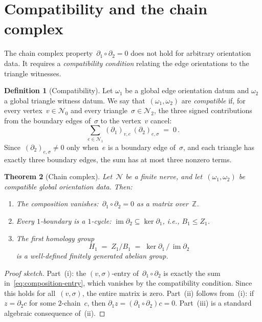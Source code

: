 \documentclass[11pt,a4paper]{article}
\theoremstyle{plain}
\newtheorem{theorem}{Theorem}[section]
\theoremstyle{definition}
\newtheorem{definition}[theorem]{Definition}
\theoremstyle{remark}
\newcommand{\ZZ}{\mathbb{Z}}
\newcommand{\cN}{\mathcal{N}}
\begin{document}
\section{Compatibility and the chain complex}
\label{sec:chain-complex}

The chain complex property~$\partial_1 \circ \partial_2 = 0$ does not
hold for arbitrary orientation data. It requires a \emph{compatibility
condition} relating the edge orientations to the triangle witnesses.

\begin{definition}[Compatibility]
\label{def:compatibility}
Let $\omega_1$ be a global edge orientation datum and $\omega_2$ a global
triangle witness datum. We say that~$(\omega_1, \omega_2)$ are
\emph{compatible} if, for every vertex~$v \in \cN_0$ and every
triangle~$\sigma \in \cN_2$, the three signed contributions from the
boundary edges of~$\sigma$ to the vertex~$v$ cancel:
\begin{equation}
  \label{eq:composition-entry}
  \sum_{e \in \cN_1} (\partial_1)_{v, e}\, (\partial_2)_{e, \sigma}
  \;=\; 0\,.
\end{equation}
Since~$(\partial_2)_{e,\sigma} \neq 0$ only when~$e$ is a boundary edge
of~$\sigma$, and each triangle has exactly three boundary edges, the sum
has at most three nonzero terms.
\end{definition}

\begin{theorem}[Chain complex]
\label{thm:chain-complex}
Let~$\cN$ be a finite nerve, and let~$(\omega_1, \omega_2)$ be compatible
global orientation data. Then:
\begin{enumerate}[label=\textup{(\roman*)},nosep]
  \item The composition vanishes:~$\partial_1 \circ \partial_2 = 0$
        as a matrix over~$\ZZ$.
  \item Every $1$-boundary is a $1$-cycle: $\operatorname{im} \partial_2
        \subseteq \ker \partial_1$, i.e., $B_1 \leq Z_1$.
  \item The first homology group
        \[
          H_1 \;=\; Z_1 / B_1
          \;=\; \ker \partial_1 \,/\, \operatorname{im} \partial_2
        \]
        is a well-defined finitely generated abelian group.
\end{enumerate}
\end{theorem}

\begin{proof}[Proof sketch]
Part~(i): the $(v, \sigma)$-entry of~$\partial_1 \circ \partial_2$ is
exactly the sum in~\eqref{eq:composition-entry}, which vanishes by the
compatibility condition. Since this holds for all~$(v,\sigma)$, the
entire matrix is zero. Part~(ii) follows from~(i): if
$z = \partial_2 c$ for some $2$-chain~$c$, then
$\partial_1 z = (\partial_1 \circ \partial_2) c = 0$.
Part~(iii) is a standard algebraic consequence of~(ii).
\end{proof}
\end{document}
